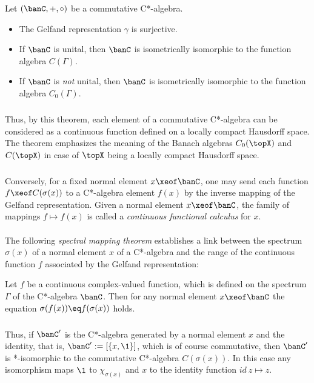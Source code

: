 \documentclass[11pt,twoside]{article}
\begin{document}
\begin{theorem1}\label{GELFAND_NAIMARK_THEOREM}
Let $(\banC,+,\circ)$ be a commutative C*-algebra.

\begin{itemize}[leftmargin=15pt]
\item[(a)]
The Gelfand representation $\gamma$ is surjective.

\item[(b)]
If $\banC$ is unital,
then $\banC$ is isometrically isomorphic to the function algebra $C(\Gamma)$.

\item[(c)]
If $\banC$ is \textit{not} unital,
then $\banC$ is isometrically isomorphic to the function algebra $C_0(\Gamma)$.
\end{itemize}
\end{theorem1}

\subparagraph{}
Thus, 
by this theorem,
each element of a commutative C*-algebra can be considered
as a continuous function defined on a locally compact Hausdorff space.
The theorem emphasizes the meaning of the Banach algebras $C_0(\topX)$
and $C(\topX)$ in case of $\topX$ being a locally compact Hausdorff space.

\subparagraph{}
Conversely,
for a fixed normal element $x \xeof \banC$,
one may send each function $f \xeof C(\sigma(x))$ to a C*-algebra element $f(x)$
by the inverse mapping of the Gelfand representation.
Given a normal element $x \xeof \banC$,
the family of mappings $f \mapsto f(x)$
is called a \textit{continuous functional calculus} for $x$.

\paragraph{} %
The following \textit{spectral mapping theorem} establishes a link
between the spectrum $\sigma(x)$ of a normal element $x$ of a C*-algebra
and the range of the continuous function $f$
associated by the Gelfand representation:

\begin{theorem1}
Let $f$ be a continuous complex-valued function,
which is defined on the spectrum $\Gamma$ of the C*-algebra $\banC$.
Then for any normal element $x \xeof \banC$
the equation $\sigma(f(x)) \eq f(\sigma(x))$ holds.
\end{theorem1}

\subparagraph{}
Thus,
if $\banC'$ is the C*-algebra generated
by a normal element $x$ and the identity,
that is, $\banC' := [\{x,\1\}]$,
which is of course commutative,
then $\banC'$ is *-isomorphic to the commutative C*-algebra $C(\sigma(x))$.
In this case any isomorphism maps $\1$ to $\chi_{\sigma(x)}$
and $x$ to the identity function $id \: z \mapsto z$.
\end{document}
